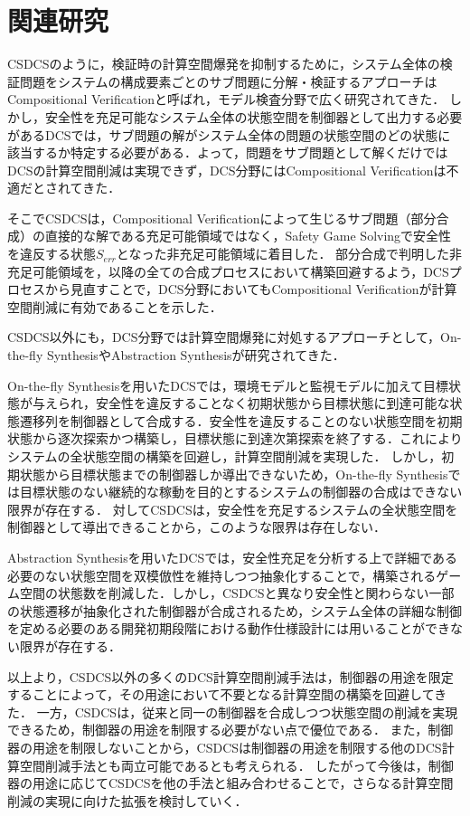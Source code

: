 \section{関連研究}
\label{section:relatedwork}
CSDCSのように，検証時の計算空間爆発を抑制するために，システム全体の検証問題をシステムの構成要素ごとのサブ問題に分解・検証するアプローチはCompositional Verificationと呼ばれ，モデル検査分野で広く研究されてきた\cite{paper:CompositionalVerification_1}\cite{paper:CompositionalVerification_2}\cite{paper:CompositionalVerification_3}\cite{paper:CompositionalVerification_4}\cite{paper:CompositionalVerification_5}\cite{paper:CompositionalVerification_6}\cite{paper:CompositionalVerification_7}\cite{paper:CompositionalVerification_8}．
しかし，安全性を充足可能なシステム全体の状態空間を制御器として出力する必要があるDCSでは，サブ問題の解がシステム全体の問題の状態空間のどの状態に該当するか特定する必要がある．よって，問題をサブ問題として解くだけではDCSの計算空間削減は実現できず，DCS分野にはCompositional Verificationは不適だとされてきた．

そこでCSDCSは，Compositional Verificationによって生じるサブ問題（部分合成）の直接的な解である充足可能領域ではなく，Safety Game Solvingで安全性を違反する状態$S_{err}$となった非充足可能領域に着目した．
部分合成で判明した非充足可能領域を，以降の全ての合成プロセスにおいて構築回避するよう，DCSプロセスから見直すことで，DCS分野においてもCompositional Verificationが計算空間削減に有効であることを示した．

CSDCS以外にも，DCS分野では計算空間爆発に対処するアプローチとして，On-the-fly SynthesisやAbstraction Synthesisが研究されてきた．

On-the-fly Synthesisを用いたDCS\cite{paper:On-the-flySyntehsis_1}\cite{paper:On-the-flySyntehsis_2}\cite{paper:On-the-flySyntehsis_3}\cite{paper:On-the-flySyntehsis_4}では，環境モデルと監視モデルに加えて目標状態が与えられ，安全性を違反することなく初期状態から目標状態に到達可能な状態遷移列を制御器として合成する．安全性を違反することのない状態空間を初期状態から逐次探索かつ構築し，目標状態に到達次第探索を終了する．これによりシステムの全状態空間の構築を回避し，計算空間削減を実現した．
しかし，初期状態から目標状態までの制御器しか導出できないため，On-the-fly Synthesisでは目標状態のない継続的な稼動を目的とするシステムの制御器の合成はできない限界が存在する．
対してCSDCSは，安全性を充足するシステムの全状態空間を制御器として導出できることから，このような限界は存在しない．

Abstraction Synthesisを用いたDCS\cite{paper:SynthesisAbstraction_1}\cite{paper:SynthesisAbstraction_2}\cite{aizawa:IEICEJ2020}では，安全性充足を分析する上で詳細である必要のない状態空間を双模倣性を維持しつつ抽象化することで，構築されるゲーム空間の状態数を削減した．しかし，CSDCSと異なり安全性と関わらない一部の状態遷移が抽象化された制御器が合成されるため，システム全体の詳細な制御を定める必要のある開発初期段階における動作仕様設計には用いることができない限界が存在する．

以上より，CSDCS以外の多くのDCS計算空間削減手法は，制御器の用途を限定することによって，その用途において不要となる計算空間の構築を回避してきた．
一方，CSDCSは，従来と同一の制御器を合成しつつ状態空間の削減を実現できるため，制御器の用途を制限する必要がない点で優位である．
また，制御器の用途を制限しないことから，CSDCSは制御器の用途を制限する他のDCS計算空間削減手法とも両立可能であるとも考えられる．
したがって今後は，制御器の用途に応じてCSDCSを他の手法と組み合わせることで，さらなる計算空間削減の実現に向けた拡張を検討していく．